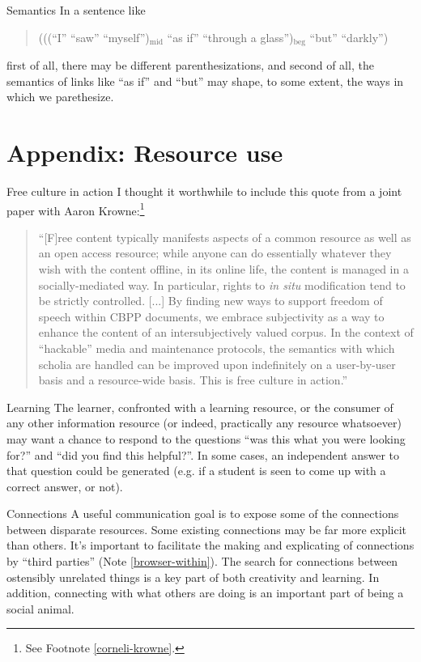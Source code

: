 \begin{notate}{Semantics}
In a sentence like
\begin{quote}
(((``I'' ``saw'' ``myself'')$_{\mathrm{mid}}$ ``as if''
  ``through a glass'')$_{\mathrm{beg}}$ ``but'' ``darkly'')
\end{quote}
first of all, there may be different parenthesizations,
and second of all, the semantics of links like ``as if''
and ``but'' may shape, to some extent, the ways in
which we parethesize.
\end{notate}

\section{Appendix: Resource use} \label{appendix-resources}

\begin{notate}{Free culture in action}
I thought it worthwhile to include this quote from
a joint paper with Aaron Krowne:\footnote{See Footnote
\ref{corneli-krowne}.}
\begin{quote}
``[F]ree content typically
  manifests aspects of a common resource as well as an
  open access resource; while anyone can do essentially
  whatever they wish with the content offline, in its
  online life, the content is managed in a
  socially-mediated way.  In particular, rights to
  \emph{in situ} modification tend to be strictly
  controlled. [...]  By finding new ways to support
  freedom of speech within CBPP documents, we embrace
  subjectivity as a way to enhance the content of an
  intersubjectively valued corpus.  In the context of
  ``hackable'' media and maintenance protocols, the
  semantics with which scholia are handled can be improved
  upon indefinitely on a user-by-user basis and a
  resource-wide basis.  This is free culture in action.''
\end{quote}
\end{notate}

\begin{notate}{Learning}
The learner, confronted with a learning resource, or the
consumer of any other information resource (or indeed,
practically any resource whatsoever) may want a chance to
respond to the questions ``was this what you were looking
for?'' and ``did you find this helpful?''.  In some cases,
an independent answer to that question could be generated
(e.g. if a student is seen to come up with a correct
answer, or not).
\end{notate}

\begin{notate}{Connections}
A useful communication goal is to expose some of the
connections between disparate resources.  Some existing
connections may be far more explicit than others.  It's
important to facilitate the making and explicating of
connections by ``third parties'' (Note
\ref{browser-within}).  The search for connections between
ostensibly unrelated things is a key part of both
creativity and learning.  In addition, connecting with
what others are doing is an important part of being a
social animal.
\end{notate}

